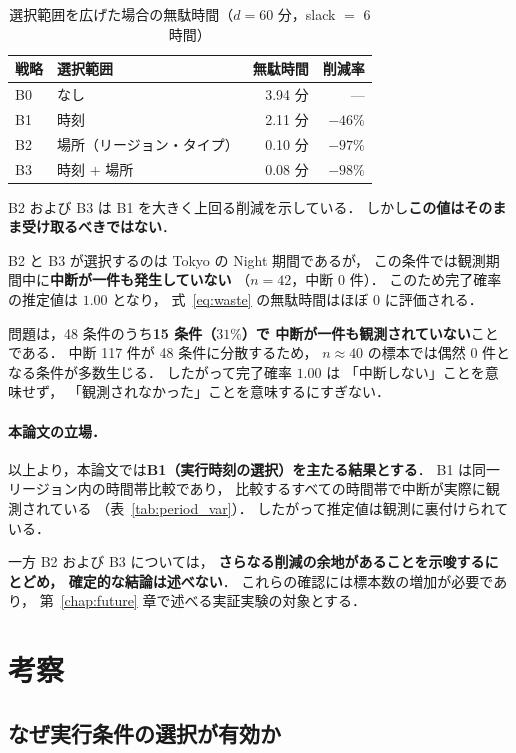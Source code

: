 \documentclass[11pt,a4paper]{ltjsreport}
\begin{document}
\begin{table}[htbp]
\centering
\caption{選択範囲を広げた場合の無駄時間（$d = 60$ 分，slack $=$ 6 時間）}
\label{tab:b2_result}
\small
\begin{tabular}{@{}llrr@{}}
\toprule
戦略 & 選択範囲 & 無駄時間 & 削減率 \\
\midrule
B0 & なし & 3.94 分 & --- \\
B1 & 時刻 & 2.11 分 & $-46\%$ \\
B2 & 場所（リージョン・タイプ） & 0.10 分 & $-97\%$ \\
B3 & 時刻 $+$ 場所 & 0.08 分 & $-98\%$ \\
\bottomrule
\end{tabular}
\end{table}

B2 および B3 は B1 を大きく上回る削減を示している．
しかし\textbf{この値はそのまま受け取るべきではない}．

B2 と B3 が選択するのは Tokyo の Night 期間であるが，
この条件では観測期間中に\textbf{中断が一件も発生していない}
（$n = 42$，中断 0 件）．
このため完了確率の推定値は $1.00$ となり，
式~\eqref{eq:waste} の無駄時間はほぼ $0$ に評価される．

問題は，48 条件のうち\textbf{15 条件（$31\%$）で
中断が一件も観測されていない}ことである．
中断 117 件が 48 条件に分散するため，
$n \approx 40$ の標本では偶然 0 件となる条件が多数生じる．
したがって完了確率 $1.00$ は
「中断しない」ことを意味せず，
「観測されなかった」ことを意味するにすぎない．

\paragraph{本論文の立場．}
以上より，本論文では\textbf{B1（実行時刻の選択）を主たる結果とする}．
B1 は同一リージョン内の時間帯比較であり，
比較するすべての時間帯で中断が実際に観測されている
（表~\ref{tab:period_var}）．
したがって推定値は観測に裏付けられている．

一方 B2 および B3 については，
\textbf{さらなる削減の余地があることを示唆するにとどめ，
確定的な結論は述べない}．
これらの確認には標本数の増加が必要であり，
第~\ref{chap:future} 章で述べる実証実験の対象とする．

\section{考察}
\label{sec:discussion}

\subsection{なぜ実行条件の選択が有効か}
\end{document}
